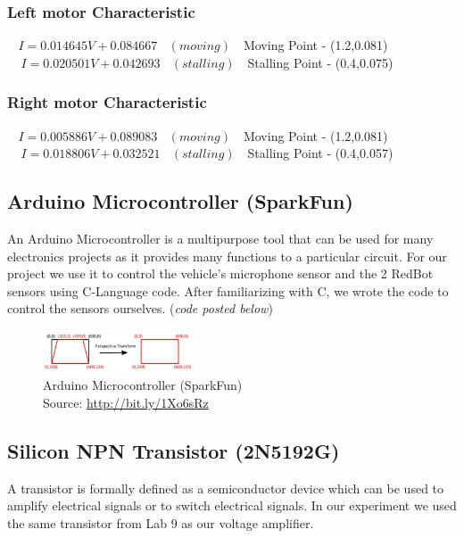 \documentclass[12pt,a4paper]{article}
\begin{document}
\begin{large}
\subsubsection{Left motor Characteristic}

$~~~~I=0.014645V+0.084667 ~~~~(moving)~~~$   Moving Point - (1.2,0.081)\\
$~~~~~I=0.020501V+0.042693 ~~~~(stalling)~~~$  Stalling Point - (0.4,0.075)
\subsubsection{Right motor Characteristic}

$~~~~I=0.005886V+0.089083 ~~~~(moving)~~~$   Moving Point - (1.2,0.081)\\
$~~~~~I=0.018806V+0.032521 ~~~~(stalling)~~~$  Stalling Point - (0.4,0.057)\\


\subsection{Arduino Microcontroller (SparkFun)}
An Arduino Microcontroller is a multipurpose tool that can be used for many electronics projects as it provides many functions to a particular circuit. For our project we use it to control the vehicle's microphone sensor and the 2 RedBot sensors using C-Language code. After familiarizing with C, we wrote the code to control the sensors ourselves. (\textit{code posted below})
\begin{figure}[hbp]
\centering
\includegraphics[width=0.4\textwidth]{images/perspective_transform.jpg}
\caption{\label{fig:i}Arduino Microcontroller (SparkFun)\\Source: \protect\url{http://bit.ly/1Xo6sRz}}
\end{figure}

\subsection{Silicon NPN Transistor (2N5192G)}
A transistor is formally defined as a semiconductor device which can be used to amplify electrical signals or to switch electrical signals. In our experiment we used the same transistor from Lab 9 as our voltage amplifier.\\


\end{large}
\end{document}
